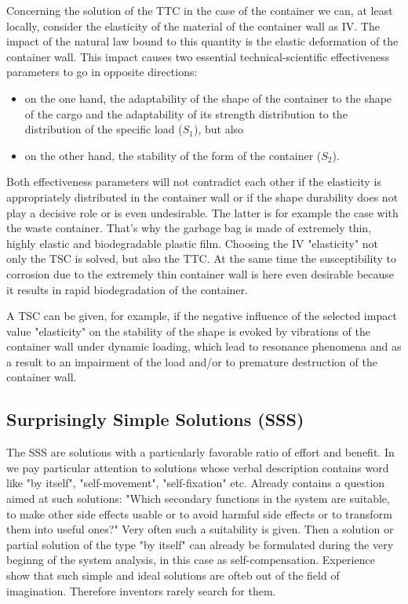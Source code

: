 \documentclass[11pt,a4paper]{article}
\begin{document}
Concerning the solution of the TTC in the case of the container we can, at
least locally, consider the elasticity of the material of the container wall
as IV. The impact of the natural law bound to this quantity is the elastic
deformation of the container wall. This impact causes two essential
technical-scientific effectiveness parameters to go in opposite directions:
\begin{itemize}
\item on the one hand, the adaptability of the shape of the container to the
  shape of the cargo and the adaptability of its strength distribution to
  the distribution of the specific load ($S_1$), but also
\item on the other hand, the stability of the form of the container ($S_2$).
\end{itemize}

Both effectiveness parameters will not contradict each other if the elasticity
is appropriately distributed in the container wall or if the shape durability
does not play a decisive role or is even undesirable. The latter is for
example the case with the waste container. That's why the garbage bag is made
of extremely thin, highly elastic and biodegradable plastic film.  Choosing
the IV "elasticity" not only the TSC is solved, but also the TTC.  At the same
time the susceptibility to corrosion due to the extremely thin container wall
is here even desirable because it results in rapid biodegradation of the
container.

A TSC can be given, for example, if the negative influence of the selected
impact value "elasticity" on the stability of the shape is evoked by
vibrations of the container wall under dynamic loading, which lead to
resonance phenomena and as a result to an impairment of the load and/or to
premature destruction of the container wall.

\subsection{Surprisingly Simple Solutions (SSS)}

The SSS are solutions with a particularly favorable ratio of effort and
benefit.  In \cite[(6.4),(9.3)]{RM-21} we pay particular attention to
solutions whose verbal description contains word like "by itself",
"self-movement", "self-fixation" etc.  Already \cite[(2.14)]{RM-21} contains a
question aimed at such solutions: "Which secondary functions in the system are
suitable, to make other side effects usable or to avoid harmful side effects
or to transform them into useful ones?" Very often such a suitability is
given. Then a solution or partial solution of the type "by itself" can already
be formulated during the very beginng of the system analysis, in this case as
self-compensation.  Experience show that such simple and ideal solutions are
ofteb out of the field of imagination.  Therefore inventors rarely search for
them.
\end{document}
